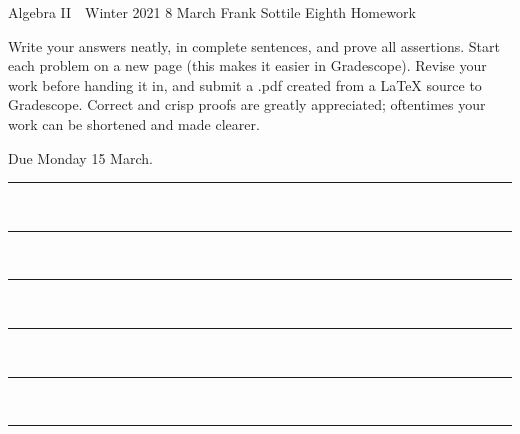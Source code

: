 \documentclass[12pt]{article}
\newcommand{\barsl}{\noindent\begin{minipage}[t]{575pt}
{\color{violet}\rule{575pt}{1.2pt}}\vspace{-5.7mm}\\
{\color{blue}\rule{575pt}{1.2pt}}\vspace{-5.7mm}\\
{\color{green}\rule{575pt}{1.2pt}}\vspace{-5.7mm}\\
{\color{yellow}\rule{575pt}{1.2pt}}\vspace{-5.7mm}\\
{\color{orange}\rule{575pt}{1.2pt}}\vspace{-5.7mm}\\
{\color{red}\rule{575pt}{1.2pt}}
\end{minipage}}
\begin{document}
\LARGE 
\noindent
Algebra II\ \ Winter 2021 \hfill 8 March\makebox[40pt][l]{\ }\newline
Frank Sottile \hfill
\Large\sf
Eighth Homework\makebox[40pt][l]{\ }
\vspace{5pt}
\normalsize

\noindent
Write your answers neatly, in complete sentences, and prove all assertions.
Start each problem on a new page (this makes it easier in Gradescope).
Revise your work before handing it in, and submit a .pdf  created from a LaTeX source to Gradescope.
Correct and crisp proofs are greatly appreciated; oftentimes your work can be shortened and made clearer.

\noindent
{\color{red}Due Monday 15 March.}\vspace{1pt}

\barsl
\end{document}
